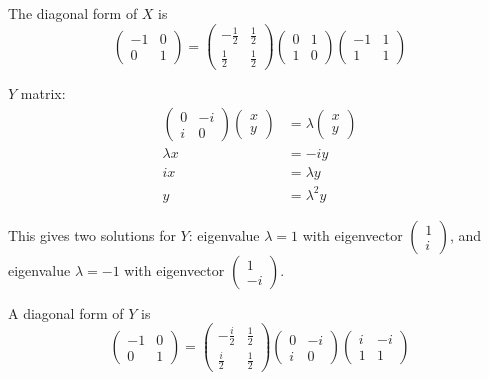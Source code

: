 \documentclass[12pt]{extarticle}
\begin{document}
The diagonal form of $X$ is
\[
\begin{pmatrix}-1 & 0 \\ 0 & 1\end{pmatrix} = \begin{pmatrix}-\frac{1}{2} & \frac{1}{2} \\ \frac{1}{2} & \frac{1}{2}\end{pmatrix} \begin{pmatrix} 0 & 1 \\ 1 & 0 \end{pmatrix} \begin{pmatrix}-1 & 1 \\ 1 & 1\end{pmatrix}
\]

$Y$ matrix:
\begin{align*}
\begin{pmatrix} 0 & -i \\ i & 0 \end{pmatrix} \begin{pmatrix} x \\ y \end{pmatrix} & = \lambda \begin{pmatrix} x \\ y \end{pmatrix} \\
\lambda x & = -i y \\
i x & = \lambda y \\
y & = \lambda^2 y
\end{align*}

This gives two solutions for $Y$: eigenvalue $\lambda=1$ with eigenvector $\begin{pmatrix} 1 \\ i \end{pmatrix}$, and eigenvalue $\lambda=-1$ with eigenvector $\begin{pmatrix} 1 \\ -i \end{pmatrix}$.

A diagonal form of $Y$ is
\[
\begin{pmatrix}-1 & 0 \\ 0 & 1\end{pmatrix} = \begin{pmatrix}-\frac{i}{2} & \frac{1}{2} \\ \frac{i}{2} & \frac{1}{2}\end{pmatrix} \begin{pmatrix} 0 & -i \\ i & 0 \end{pmatrix} \begin{pmatrix}i & -i \\ 1 & 1\end{pmatrix}
\]
\end{document}
